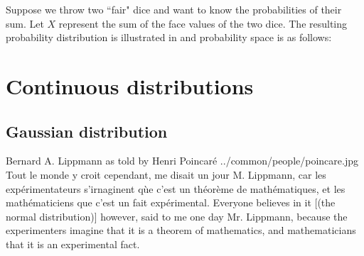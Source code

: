 \begin{example}
\label{ex:two_dice}
Suppose we throw two ``fair" dice and want to know the probabilities of their sum.
Let $X$ represent the sum  of the face values of the two dice.
The resulting probability distribution is illustrated in 
and probability space is as follows:


\end{example}

\section{Continuous distributions}
\subsection{Gaussian distribution}
\qboxnpqt
  {Bernard A. Lippmann as told by Henri Poincar\'e
    
    
   \footnotemark
  }
  {../common/people/poincare.jpg}
  {Tout le monde y croit cependant, me disait un jour M. Lippmann,
   car les exp\'erimentateurs s'irnaginent q\`ue c'est un th\'eor\`eme
   de math\'ematiques, et les math\'ematiciens que c'est un fait
   exp\'erimental.}
  {Everyone believes in it [(the normal distribution)] however, 
   said to me one day Mr. Lippmann, because the experimenters imagine that 
   it is a theorem of mathematics, 
   and mathematicians that it is an experimental fact.}



